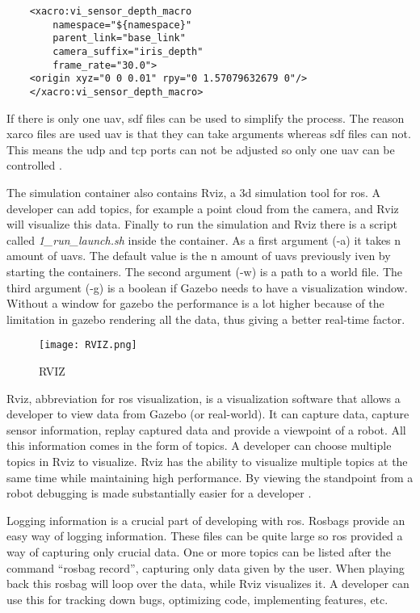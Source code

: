 \begin{verbatim}
    <xacro:vi_sensor_depth_macro
        namespace="${namespace}"
        parent_link="base_link"
        camera_suffix="iris_depth"
        frame_rate="30.0">
    <origin xyz="0 0 0.01" rpy="0 1.57079632679 0"/>
    </xacro:vi_sensor_depth_macro>

\end{verbatim}

If there is only one \acs{uav}, \acs{sdf} files can be used to simplify the process. The reason xarco files are used \acs{uav} is that 
they can take arguments 
whereas \acs{sdf} files can not. 
This means the \acs{udp} and \acs{tcp} ports can not be adjusted so only one \acs{uav} can be controlled \cite{sim:issue}. 

\newpage
The simulation container also contains Rviz, a \acs{3d} simulation tool for \acs{ros}. A developer can add topics, 
for example a point cloud from the camera, 
and Rviz will visualize this data.     
Finally to run the simulation and Rviz there is a script called \textit{1\_run\_launch.sh} inside the container. 
As a first argument (-a) it takes n amount of \acp{uav}. The default value is the n amount of \acp{uav} previously 
iven by starting the containers. 
The second argument (-w) is a path to a world file. The third argument (-g) is a boolean if Gazebo needs to have a visualization window. 
Without a window for gazebo the performance is a lot higher because of the limitation in gazebo rendering all 
the data, thus giving a better real-time factor.

\begin{figure}[ht]
    \centering
    \texttt{[image: RVIZ.png]}
    \caption[RIVZ]{RVIZ}
\end{figure}

Rviz, abbreviation for \acs{ros} visualization, is a visualization software that allows a developer to view data from Gazebo (or real-world). 
It can capture data, capture sensor information, replay captured data and provide a viewpoint of a robot. All this information 
comes in the form of topics. 
A developer can choose multiple topics in Rviz to visualize. Rviz has the ability to visualize multiple topics at the same 
time while maintaining high performance. 
By viewing the standpoint from a robot debugging is made substantially easier for a developer \cite{ros:rviz}.

Logging information is a crucial part of developing with \acs{ros}. Rosbags provide an easy way of logging information. 
These files can be quite large so \acs{ros} provided a way of capturing only crucial data. 
One or more topics can be listed after the command “rosbag record”, capturing only data given by the user. When playing back this rosbag will 
loop over the data, while Rviz visualizes it. A developer can use this for tracking down bugs, optimizing code, implementing features, etc.